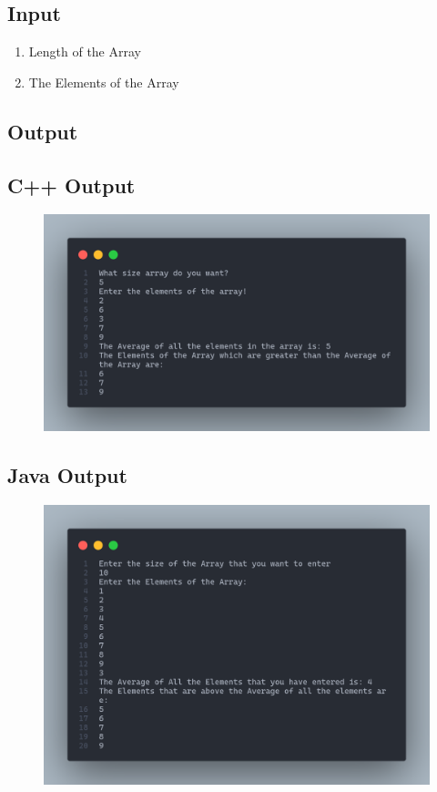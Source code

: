\documentclass[11pt]{article}
\begin{document}
% 

\subsection{Input}
\begin{enumerate}
	\item Length of the Array
	\item The Elements of the Array
\end{enumerate}

\subsection{Output}

\subsection{C++ Output}
\begin{figure}[H]
	\centering
	\includegraphics[scale=0.30]{output.png}
	\caption{}
\end{figure}


\subsection{Java Output}
\begin{figure}[H]
	\centering
	\includegraphics[scale=0.30]{outputj.png}
	\caption{}
\end{figure}

% 

% 
\end{document}
